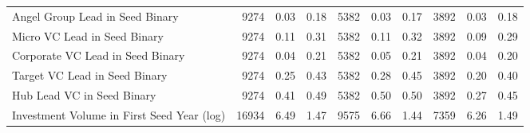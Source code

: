 {\begin{table}[!h]
{\begin{tabular}[t]{lrrrrrrrrr}
Angel Group Lead in Seed Binary & 9274 & 0.03 & 0.18 & 5382 & 0.03 & 0.17 & 3892 & 0.03 & 0.18\\
Micro VC Lead in Seed Binary & 9274 & 0.11 & 0.31 & 5382 & 0.11 & 0.32 & 3892 & 0.09 & 0.29\\
Corporate VC Lead in Seed Binary & 9274 & 0.04 & 0.21 & 5382 & 0.05 & 0.21 & 3892 & 0.04 & 0.20\\
Target VC Lead in Seed Binary & 9274 & 0.25 & 0.43 & 5382 & 0.28 & 0.45 & 3892 & 0.20 & 0.40\\
\addlinespace
Hub Lead VC in Seed Binary & 9274 & 0.41 & 0.49 & 5382 & 0.50 & 0.50 & 3892 & 0.27 & 0.45\\
Investment Volume in First Seed Year (log) & 16934 & 6.49 & 1.47 & 9575 & 6.66 & 1.44 & 7359 & 6.26 & 1.49\\
\bottomrule
\end{tabular}}
\end{table}
}
